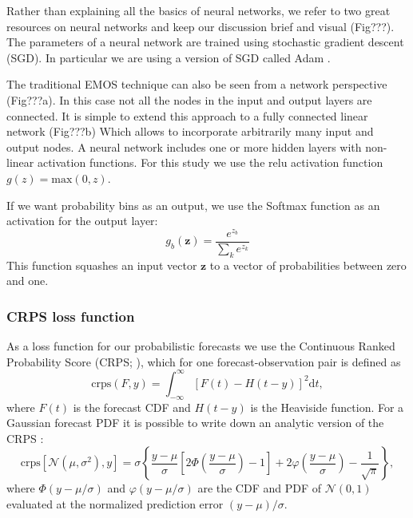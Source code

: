 \documentclass[a4paper,10pt]{scrartcl}
\begin{document}
Rather than explaining all the basics of neural networks, we refer to two great resources on neural networks \citep{Nielsen2015, Goodfellow2016} and keep our discussion brief and visual (Fig???). The parameters of a neural network are trained using stochastic gradient descent (SGD). In particular we are using a version of SGD called Adam \citep{???}.

The traditional EMOS technique can also be seen from a network perspective (Fig???a). In this case not all the nodes in the input and output layers are connected. It is simple to extend this approach to a fully connected linear network (Fig???b) Which allows to incorporate arbitrarily many input and output nodes. A neural network includes one or more hidden layers with non-linear activation functions. For this study we use the relu activation function $g(z) = \mathrm{max}(0, z)$.

If we want probability bins as an output, we use the Softmax function as an activation for the output layer: 
\begin{equation}
 g_b(\mathbf{z}) = \frac{e^{z_b}}{\sum_k e^{z_k}}
\end{equation}
This function squashes an input vector $\mathbf{z}$ to a vector of probabilities between zero and one.

\subsubsection{CRPS loss function}
As a loss function for our probabilistic forecasts we use the Continuous Ranked Probability Score (CRPS; \cite{???}), which for one forecast-observation pair is defined as 
\begin{equation}
 \mathrm{crps}(F, y) = \int_{-\infty}^{\infty} [F(t) - H(t-y)]^2\mathrm{d}t,
\end{equation}
where $F(t)$ is the forecast CDF and $H(t-y)$ is the Heaviside function. For a Gaussian forecast PDF it is possible to write down an analytic version of the CRPS \citep{Gneiting2005}:
\begin{equation}
 \mathrm{crps}[\mathcal{N}(\mu, \sigma^2), y] = \sigma \left\lbrace \frac{y - \mu}{\sigma} \left[ 2\Phi \left( \frac{y-\mu}{\sigma} \right) -1 \right] + 2\varphi \left(\frac{y-\mu}{\sigma} \right) - \frac{1}{\sqrt{\pi}} \right\rbrace,
\end{equation}
where $\Phi \left( y-\mu/\sigma \right)$ and $\varphi \left( y-\mu/\sigma \right)$ are the CDF and PDF of $\mathcal{N}(0, 1)$ evaluated at the normalized prediction error $(y-\mu)/\sigma$.
\end{document}
